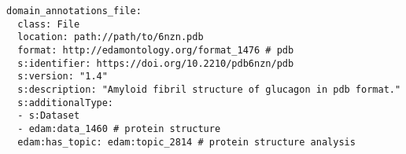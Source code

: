 \begin{verbatim}
domain_annotations_file:
  class: File
  location: path://path/to/6nzn.pdb
  format: http://edamontology.org/format_1476 # pdb
  s:identifier: https://doi.org/10.2210/pdb6nzn/pdb 
  s:version: "1.4"
  s:description: "Amyloid fibril structure of glucagon in pdb format."
  s:additionalType:
  - s:Dataset
  - edam:data_1460 # protein structure
  edam:has_topic: edam:topic_2814 # protein structure analysis
\end{verbatim}